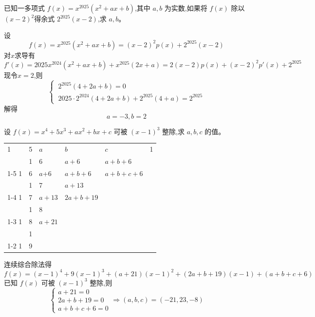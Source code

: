 \begin{questions}
    \question 已知一多项式 $f(x) = x^{2025}(x^{2} + ax + b)$,其中 $a, b$ 为实数,如果将 $f(x)$ 除以 $(x - 2)^2$得余式 $2^{2025}(x - 2)$,求 $a, b$。
    \begin{solution}
        设
        \[
        f(x) = x^{2025}(x^2 + ax + b) = (x - 2)^2 p(x) + 2^{2025}(x - 2)
        \]
        对$x$求导有
        \[
        f'(x) = 2025x^{2024}(x^2 + ax + b) + x^{2025}(2x + a)
        = 2(x - 2)p(x) + (x - 2)^2 p'(x) + 2^{2025}
        \]
        现令$x=2$,则
        \[
        \begin{cases}
         \ 2^{2025}(4 + 2a + b) = 0  \\
         \ 2025 \cdot 2^{2024}(4 + 2a + b) + 2^{2025}(4 + a) = 2^{2025}
        \end{cases}
        \]
        解得
        \[
         a = -3,b = 2
        \]
    \end{solution}
    
    \question 设 $f(x) = x^4 + 5x^3 + a x^2 + b x + c$ 可被 $(x-1)^3$ 整除,求 $a,b,c$ 的值。 
    \ifprintanswers
    \begin{table}[H]
        \centering
        \begin{tabular}{llllll}
        1 & 5  & $a$    & $b$    & \multicolumn{1}{l|}{$c$}  & 1 \\
        & 1   & 6    & $a+6$   & \multicolumn{1}{l|}{$a+b+6$} &   \\ \cline{1-5}
        1 & 6    & $a$+6    & \multicolumn{1}{l|}{$a+b+6$} & $a+b+c+6$       &   \\
        & 1    & 7    & \multicolumn{1}{l|}{$a+13$}  &  &   \\ \cline{1-4}
        1 & 7   & \multicolumn{1}{l|}{$a+13$} & $2a+b+19$  &   &  \\
          & 1  & \multicolumn{1}{l|}{8}  &  &  &   \\ \cline{1-3}
        1 & \multicolumn{1}{l|}{8} & $a+21$ & & &   \\
          & \multicolumn{1}{l|}{1} &  &  &   &   \\ \cline{1-2}
        1 & 9  &  &    &    &  
        \end{tabular}
    \end{table}
    \fi
    \begin{solution}
        连续综合除法得\[
        f(x)=(x-1)^4+9(x-1)^3+(a+21)(x-1)^2+(2a+b+19)(x-1)+(a+b+c+6)
        \]
        已知 $f(x)$ 可被 $(x-1)^3$ 整除,则
        \[
        \begin{cases}
            a+21=0\\2a+b+19=0\\a+b+c+6=0
        \end{cases} \Rightarrow (a,b,c)=(-21,23,-8)
        \]
    \end{solution}


\end{questions}
